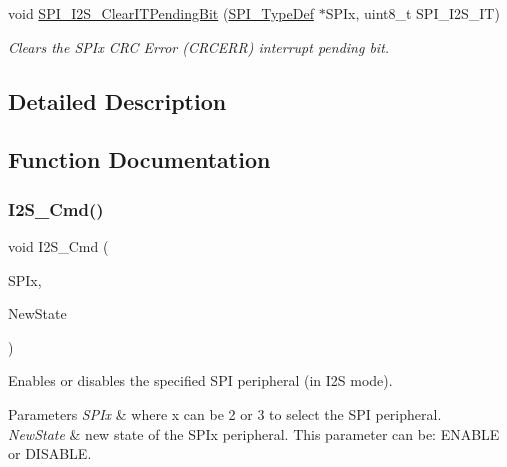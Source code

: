 \begin{DoxyCompactItemize}
void \mbox{\hyperlink{group___s_p_i___exported___functions_ga35a524a49ff3d058137060f751e8749f}{S\+P\+I\+\_\+\+I2\+S\+\_\+\+Clear\+I\+T\+Pending\+Bit}} (\mbox{\hyperlink{struct_s_p_i___type_def}{S\+P\+I\+\_\+\+Type\+Def}} $\ast$S\+P\+Ix, uint8\+\_\+t S\+P\+I\+\_\+\+I2\+S\+\_\+\+IT)
\begin{DoxyCompactList}\small\item\em Clears the S\+P\+Ix C\+RC Error (C\+R\+C\+E\+RR) interrupt pending bit. \end{DoxyCompactList}\end{DoxyCompactItemize}


\subsection{Detailed Description}


\subsection{Function Documentation}
\mbox{\label{group___s_p_i___exported___functions_gafe061c71bbc5b4224f3f2884dc53739e}} 
\subsubsection{\texorpdfstring{I2S\_Cmd()}{I2S\_Cmd()}}
{\footnotesize\ttfamily void I2\+S\+\_\+\+Cmd (\begin{DoxyParamCaption}\item[{\mbox{\hyperlink{struct_s_p_i___type_def}{S\+P\+I\+\_\+\+Type\+Def}} $\ast$}]{S\+P\+Ix,  }\item[{\mbox{\hyperlink{group___exported__types_gac9a7e9a35d2513ec15c3b537aaa4fba1}{Functional\+State}}}]{New\+State }\end{DoxyParamCaption})}



Enables or disables the specified S\+PI peripheral (in I2S mode). 


\begin{DoxyParams}{Parameters}
{\em S\+P\+Ix} & where x can be 2 or 3 to select the S\+PI peripheral. \\
\hline
{\em New\+State} & new state of the S\+P\+Ix peripheral. This parameter can be\+: E\+N\+A\+B\+LE or D\+I\+S\+A\+B\+LE. \\
\hline
\end{DoxyParams}

